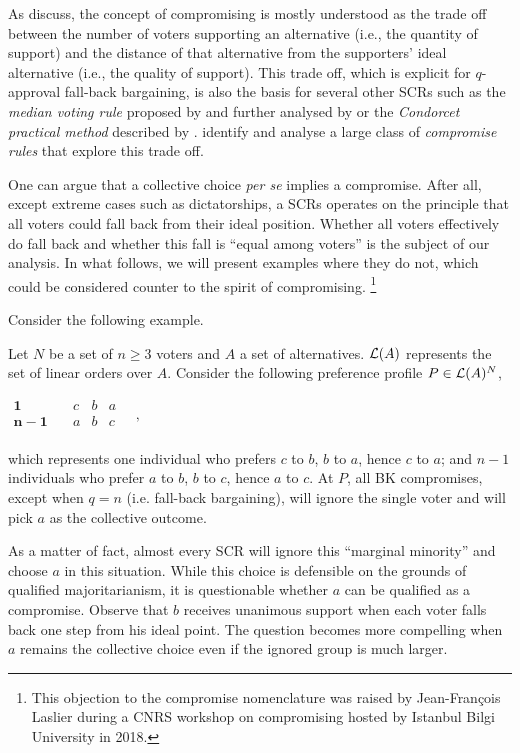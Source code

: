 As \citet{OezkalSanver2004} discuss, the concept of compromising is mostly understood as the trade off between the number of voters supporting an alternative (i.e., the quantity of support) and the distance of that alternative from the supporters’ ideal alternative (i.e., the quality of support). This trade off, which is explicit for $q$-approval fall-back bargaining, is also the basis for several other \acp{SCR} such as the \emph{median voting rule} proposed by \citet{Bassett1999} and further analysed by \citet{Gehrlein2003} or the \emph{Condorcet practical method} described by \citet{Nurmi1999}.  identify and analyse a large class of \emph{compromise rules} that explore this trade off.

One can argue that a collective choice \emph{per se} implies a compromise. After all, except extreme cases such as dictatorships,
a \acp{SCR} operates on the principle that all voters could fall back from their ideal position. Whether all voters effectively do fall back and whether this fall is “equal among voters” is the subject of our analysis. In what follows, we will present examples where they do not, which could be considered counter to the spirit of compromising. \footnote{This objection to the compromise nomenclature was raised by Jean-François Laslier during a CNRS workshop on compromising hosted by Istanbul Bilgi University in 2018.}

Consider the following example.
\begin{example}
	\label{ex:ex1}
	Let $N$ be a set of $n ≥ 3$ voters and $A$ a set of alternatives. $\mathcal{L}(A)$ represents the set of linear orders over $A$. Consider the following preference profile $P\in \mathcal{L}(A)^{N}$,
	\begin{center}
		$
		\begin{array}{cccc}
			\mathbf{1} \quad &c&b&a\\
			\mathbf{n-1} \quad &a&b&c\\
		\end{array}\quad ,
		$
	\end{center}
	which represents one individual who prefers $c$ to $b$, $b$ to $a$, hence $c$ to $a$; and $n-1$ individuals who prefer $a$ to $b$, $b$ to $c$, hence $a$ to $c$. At $P$, all BK compromises, except when $q=n$ (i.e. fall-back bargaining), will ignore the single voter and will pick $a$ as the collective outcome.
\end{example}

As a matter of fact, almost every \ac{SCR} will ignore this “marginal minority” and choose $a$ in this situation. While this choice is defensible on the grounds of qualified majoritarianism, it is questionable whether $a$ can be qualified as a compromise. Observe that $b$ receives unanimous support when each voter falls back one step from his ideal point. The question becomes more compelling when $a$ remains the collective choice even if the ignored group is much larger.

